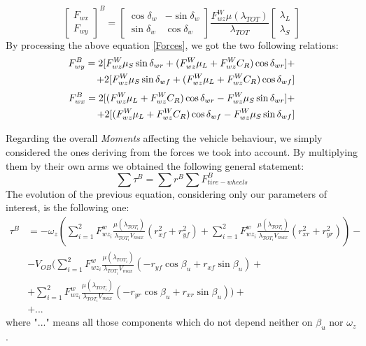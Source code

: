 \begin{equation} \label{Forces}
\begin{bmatrix}
F_{wx} \\
F_{wy}
\end{bmatrix}^{B} =	
\begin{bmatrix}
\cos\delta_{w} & -\sin\delta_{w} \\
\sin\delta_{w} & \cos\delta_{w}
\end{bmatrix}
\frac{F_{wz}^{W} \mu(\lambda_{TOT})}{\lambda_{TOT}}
\begin{bmatrix}
\lambda_{L} \\
\lambda_{S}
\end{bmatrix}
\end{equation}
By processing the above equation \ref{Forces}, we got the two following relations:
\begin{equation} \label{F_{wy}}
\begin{split}
F_{wy}^{B} = 2 [F_{wz}^{W} \mu_{S}\sin\delta_{wr} + (F_{wz}^{W} \mu_{L} + F_{wz}^{W} C_{R}) \cos\delta_{wr}] + \\ + 2 [F_{wz}^{W} \mu_{S}\sin\delta_{wf} + (F_{wz}^{W} \mu_{L} + F_{wz}^{W} C_{R})\cos\delta_{wf}] 
\end{split}
\end{equation}
\begin{equation} \label{F_{wx}}
\begin{split}
F_{wx}^{B} = 2 [(F_{wz}^{W} \mu_{L} + F_{wz}^{W} C_{R})\cos\delta_{wr} - F_{wz}^{W} \mu_{S}\sin\delta_{wr}] + \\ + 2 [(F_{wz}^{W} \mu_{L} + F_{wz}^{W} C_{R})\cos\delta_{wf} - F_{wz}^{W} \mu_{S}\sin\delta_{wf}] 
\end{split}
\end{equation}

Regarding the overall \textit{Moments} affecting the vehicle behaviour, we simply considered the ones deriving from the forces we took into account. By multiplying them by their own arms we obtained the following general statement:
\begin{equation}
\sum \tau^{B} = \sum r^{B} \sum F_{tire-wheels}^{B}
\end{equation}
The evolution of the previous equation, considering only our parameters of interest, is the following one:  
\begin{equation}
\begin{split}
\tau^{B} &= -\omega_{z}(\sum_{i=1}^{2} F_{wz_{i}}^{w} \frac{\mu(\lambda_{TOT_{i}})}{\lambda_{TOT_{i}} V_{max}} (r_{xf}^{2} + r_{yf}^{2}) + \sum_{i=1}^{2} F_{wz_{i}}^{w} \frac{\mu(\lambda_{TOT_{i}})}{\lambda_{TOT_{i}} V_{max}} (r_{xr}^{2} + r_{yr}^{2})) - \\ &- V_{OB}(\sum_{i=1}^{2} F_{wz_{i}}^{w} \frac{\mu(\lambda_{TOT_{i}})}{\lambda_{TOT_{i}} V_{max}} (- r_{yf} \cos \beta_{u} + r_{xf} \sin\beta_{u}) + \\ & + \sum_{i=1}^{2} F_{wz_{i}}^{w} \frac{\mu(\lambda_{TOT_{i}})}{\lambda_{TOT_{i}} V_{max}} (- r_{yr} \cos \beta_{u} + r_{xr} \sin\beta_{u})) + \\ &+ ... 
\end{split}	
\end{equation}
where "$ ... $" means all those components which do not depend neither on $\beta_{u}$ nor $\omega_{z}$.
